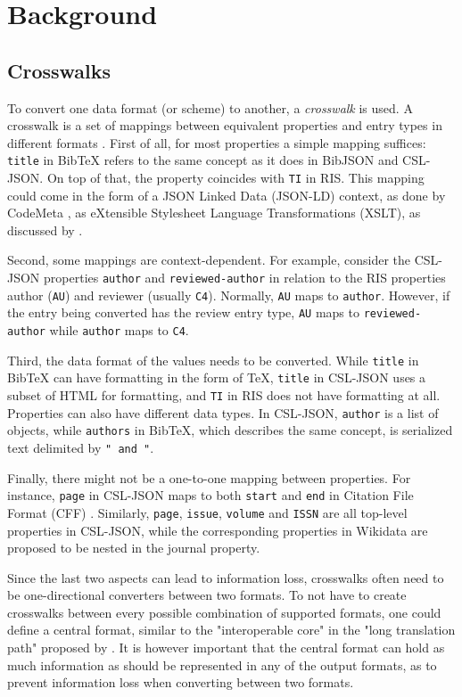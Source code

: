 \documentclass[fleqn,10pt,lineno]{wlpeerj} %
\begin{document}
\section*{Background}

\subsection*{Crosswalks}

To convert one data format (or scheme) to another, a \emph{crosswalk} is used. A crosswalk is a set of mappings between equivalent properties and entry types in different formats \citep{pierre_issues_1998}. First of all, for most properties a simple mapping suffices: \texttt{title} in BibTeX refers to the same concept as it does in BibJSON and CSL-JSON. On top of that, the property coincides with \texttt{TI} in RIS. This mapping could come in the form of a JSON Linked Data (JSON-LD) context, as done by CodeMeta \citep{jones_codemeta:_2017}, as eXtensible Stylesheet Language Transformations (XSLT), as discussed by \cite{godby_two_2003}.

Second, some mappings are context-dependent. For example, consider the CSL-JSON properties \texttt{author} and \texttt{reviewed-author} in relation to the RIS properties author (\texttt{AU}) and reviewer (usually \texttt{C4}). Normally, \texttt{AU} maps to \texttt{author}. However, if the entry being converted has the review entry type, \texttt{AU} maps to \texttt{reviewed-author} while \texttt{author} maps to \texttt{C4}.

Third, the data format of the values needs to be converted. While \texttt{title} in BibTeX can have formatting in the form of \TeX, \texttt{title} in CSL-JSON uses a subset of HTML for formatting, and \texttt{TI} in RIS does not have formatting at all. Properties can also have different data types. In CSL-JSON, \texttt{author} is a list of objects, while \texttt{authors} in BibTeX, which describes the same concept, is serialized text delimited by \texttt{" and "}.

Finally, there might not be a one-to-one mapping between properties. For instance, \texttt{page} in CSL-JSON maps to both \texttt{start} and \texttt{end} in Citation File Format (CFF) \citep{druskat_citation_2018}. Similarly, \texttt{page}, \texttt{issue}, \texttt{volume} and \texttt{ISSN} are all top-level properties in CSL-JSON, while the corresponding properties in Wikidata are proposed to be nested in the journal property.

Since the last two aspects can lead to information loss, crosswalks often need to be one-directional converters between two formats. To not have to create crosswalks between every possible combination of supported formats, one could define a central format, similar to the "interoperable core" in the "long translation path" proposed by \cite{godby_two_2003}. It is however important that the central format can hold as much information as should be represented in any of the output formats, as to prevent information loss when converting between two formats.
\end{document}
